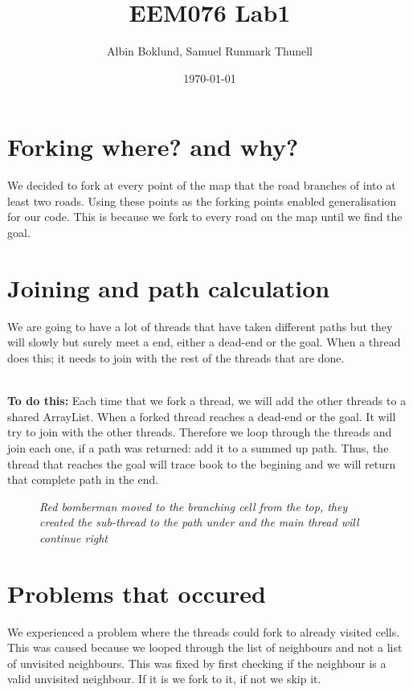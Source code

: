 \documentclass[11pt]{article}
\title{ EEM076 Lab1 }
\author{ Albin Boklund, Samuel Runmark Thunell }
\date{\today}
\begin{document}
\maketitle

\pagebreak


\section{Forking where? and why?}

We decided to fork at every point of the map that the road branches of into at least two roads. 
Using these points as the forking points enabled generalisation for our code. 
This is because we fork to every road on the map until we find the goal.

\section{Joining and path calculation}
We are going to have a lot of threads that have taken different paths but they will slowly but surely meet a end, either a dead-end or the goal.
When a thread does this; it needs to join with the rest of the threads that are done.

\noindent
\\
{\bf To do this:} Each time that we fork a thread, we will add the other threads to a shared ArrayList.
When a forked thread reaches a dead-end or the goal. It will try to join with the other threads.
Therefore we loop through the threads and join each one, if a path was returned: add it to a summed up path.
Thus, the thread that reaches the goal will trace book to the begining and we will return that complete path in the end.

\begin{figure}[h]
\label{screenshot}
\centering
\caption{\it Red bomberman moved to the branching cell from the top, they created the sub-thread to the path under and the main thread will continue right}
\end{figure}

\section{Problems that occured}
We experienced a problem where the threads could fork to already visited cells.
This was caused because we looped through the list of neighbours and not a list of unvisited neighbours.
This was fixed by first checking if the neighbour is a valid unvisited neighbour.
If it is we fork to it, if not we skip it.\\
\end{document}
